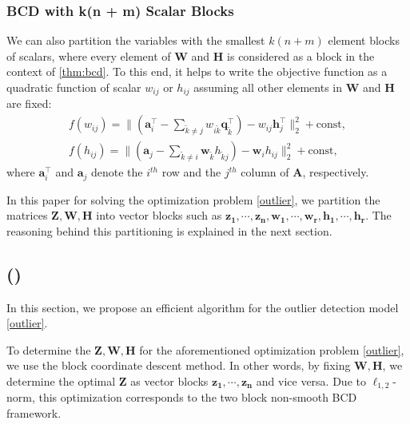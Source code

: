 \subsubsection{BCD with k(n + m) Scalar Blocks}
 We can also partition the variables with the smallest  $k(n+m)$ element blocks of scalars, where every element of $\mathbf{W}$ and $\mathbf{H}$ is considered as a block in the context of \ref{thm:bcd}.   To this end, it
helps to write the objective function as a quadratic function of scalar
$w_{ij}$ or $h_{ij}$ assuming all other elements in $\mathbf{W}$
and $\mathbf{H}$ are fixed: \begin{subequations} \label{eq:nmf_element_objective}
\begin{gather}
f(w_{ij})  =  \|(\mathbf{a}_{i}^\intercal-\sum_{\tilde{k}\ne j}w_{i\tilde{k}}\mathbf{q}_{\tilde{k}}^\intercal)-w_{ij}\mathbf{h}_{j}^\intercal\|_{2}^{2}+\mbox{const},\\
f(h_{ij})  =  \|(\mathbf{a}_{j}-\sum_{\tilde{k}\ne i}\mathbf{w}_{\tilde{k}} h_{\tilde{k}j})-\mathbf{w}_{ i}h_{ij}\|_{2}^{2}+\mbox{const},
\end{gather}
\end{subequations} where $\mathbf{a}_{i}^\intercal$ and $\mathbf{a}_{j}$
denote the $i^{th}$ row and the $j^{th}$ column of $\mathbf{A}$,
respectively.


In this paper for solving the optimization problem \eqref{outlier},
we partition the matrices $\mathbf{Z,W,H}$ into vector blocks such
as \linebreak $\mathbf{z_1, \cdots, z_n, w_1, \cdots, w_r, h_1,\cdots, h_r}$. The
reasoning behind this partitioning is explained in the next section.

\subsection{\algofull (\algo)}
In this section, we propose an efficient algorithm for the outlier
detection model \eqref{outlier}.

To determine the $\mathbf{Z,W,H}$ for the aforementioned
optimization problem \eqref{outlier}, we use the  block coordinate
descent method. In other words, by fixing $\mathbf{W,H}$, we
determine the optimal $\mathbf{Z}$ as vector blocks
$\mathbf{z_1,\cdots,z_n}$ and vice versa. Due to $\ell_{1,2}$-norm,
this optimization corresponds to the two block non-smooth BCD
framework.

